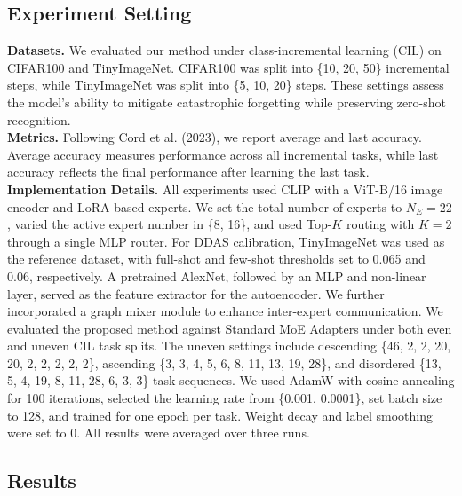 \documentclass{article}
\theoremstyle{definition}
\theoremstyle{remark}
\begin{document}
\subsection{Experiment Setting}
\textbf{Datasets.}
We evaluated our method under class-incremental learning (CIL) on CIFAR100 and TinyImageNet. CIFAR100 was split into \{10, 20, 50\} incremental steps, while TinyImageNet was split into \{5, 10, 20\} steps. These settings assess the model's ability to mitigate catastrophic forgetting while preserving zero-shot recognition.\\
\textbf{Metrics.}
Following Cord et al. (2023), we report average and last accuracy. Average accuracy measures performance across all incremental tasks, while last accuracy reflects the final performance after learning the last task.\\
\textbf{Implementation Details.}
All experiments used CLIP with a ViT-B/16 image encoder and LoRA-based experts. We set the total number of experts to $N_E=22$, varied the active expert number in \{8, 16\}, and used Top-$K$ routing with $K=2$ through a single MLP router. For DDAS calibration, TinyImageNet was used as the reference dataset, with full-shot and few-shot thresholds set to 0.065 and 0.06, respectively. A pretrained AlexNet, followed by an MLP and non-linear layer, served as the feature extractor for the autoencoder. We further incorporated a graph mixer module to enhance inter-expert communication.
We evaluated the proposed method against Standard MoE Adapters under both even and uneven CIL task splits. The uneven settings include descending \{46, 2, 2, 20, 20, 2, 2, 2, 2, 2\}, ascending \{3, 3, 4, 5, 6, 8, 11, 13, 19, 28\}, and disordered \{13, 5, 4, 19, 8, 11, 28, 6, 3, 3\} task sequences. We used AdamW with cosine annealing for 100 iterations, selected the learning rate from \{0.001, 0.0001\}, set batch size to 128, and trained for one epoch per task. Weight decay and label smoothing were set to 0. All results were averaged over three runs.
\subsection{Results}
\end{document}
